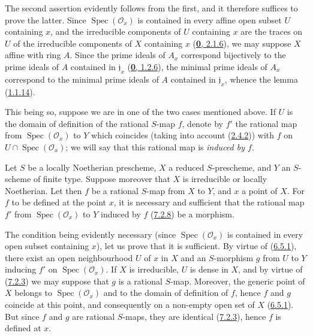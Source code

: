 The second assertion evidently follows from the first, and it therefore
suffices to prove the latter. Since $\operatorname{Spec}(\mathscr{O}_x)$ is
contained in every affine open subset $U$ containing $x$, and the irreducible
components of $U$ containing $x$ are the traces on $U$ of the irreducible
components of $X$ containing $x$
(\hyperref[0.2.1.6]{\textbf{0}, 2.1.6}), we may suppose $X$ affine with ring $A$.
Since the prime ideals of $A_x$ correspond bijectively to the prime ideals
of $A$ contained in $\mathfrak{j}_x$
(\hyperref[0.1.2.6]{\textbf{0}, 1.2.6}), the minimal prime ideals of $A_x$
correspond to the minimal prime ideals of $A$ contained in
$\mathfrak{j}_x$, whence the lemma (\hyperref[I.1.1.14]{1.1.14}).

This being so, suppose we are in one of the two cases mentioned above. If $U$
is the domain of definition of the rational $S$-map $f$, denote by $f'$ the
rational map from $\operatorname{Spec}(\mathscr{O}_x)$ to $Y$ which coincides
(taking into account (\hyperref[I.2.4.2]{2.4.2})) with $f$ on
$U\cap\operatorname{Spec}(\mathscr{O}_x)$; we will say that this rational map
is \emph{induced by $f$}.

\begin{proposition}[7.2.9]
\label{I.7.2.9}
Let $S$ be a locally Noetherian prescheme, $X$ a reduced $S$-prescheme, and
$Y$ an $S$-scheme of finite type. Suppose moreover that $X$ is irreducible or
locally Noetherian. Let then $f$ be a rational $S$-map from $X$ to $Y$, and
$x$ a point of $X$. For $f$ to be defined at the point $x$, it is necessary
and sufficient that the rational map $f'$ from
$\operatorname{Spec}(\mathscr{O}_x)$ to $Y$ induced by $f$
\textup{(\hyperref[I.7.2.8]{7.2.8})} be a morphism.
\end{proposition}

The condition being evidently necessary (since
$\operatorname{Spec}(\mathscr{O}_x)$ is contained in every open subset containing
$x$), let us prove that it is sufficient. By virtue of
(\hyperref[I.6.5.1]{6.5.1}), there exist an open neighbourhood $U$ of $x$
in $X$ and an $S$-morphism $g$ from $U$ to $Y$ inducing $f'$ on
$\operatorname{Spec}(\mathscr{O}_x)$. If $X$ is irreducible, $U$ is dense in
$X$, and by virtue of (\hyperref[I.7.2.3]{7.2.3}) we may suppose that $g$
is a rational $S$-map. Moreover, the generic point of $X$ belongs to
$\operatorname{Spec}(\mathscr{O}_x)$ and to the domain of definition of $f$,
hence $f$ and $g$ coincide at this point, and consequently on a non-empty open
set of $X$ (\hyperref[I.6.5.1]{6.5.1}). But since $f$ and $g$ are rational
$S$-maps, they are identical (\hyperref[I.7.2.3]{7.2.3}), hence $f$ is
defined at $x$.

